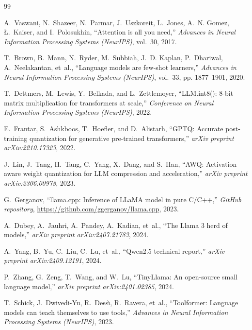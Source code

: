 \documentclass[12pt,a4paper,oneside]{report}
\begin{document}
\newpage
\begin{thebibliography}{99}

A.~Vaswani, N.~Shazeer, N.~Parmar, J.~Uszkoreit, L.~Jones, A.~N. Gomez, \L.~Kaiser, and I.~Polosukhin,
``Attention is all you need,''
\emph{Advances in Neural Information Processing Systems (NeurIPS)}, vol.~30, 2017.

T.~Brown, B.~Mann, N.~Ryder, M.~Subbiah, J.~D. Kaplan, P.~Dhariwal, A.~Neelakantan, et~al.,
``Language models are few-shot learners,''
\emph{Advances in Neural Information Processing Systems (NeurIPS)}, vol.~33, pp. 1877--1901, 2020.

T.~Dettmers, M.~Lewis, Y.~Belkada, and L.~Zettlemoyer,
``LLM.int8(): 8-bit matrix multiplication for transformers at scale,''
\emph{Conference on Neural Information Processing Systems (NeurIPS)}, 2022.

E.~Frantar, S.~Ashkboos, T.~Hoefler, and D.~Alistarh,
``GPTQ: Accurate post-training quantization for generative pre-trained transformers,''
\emph{arXiv preprint arXiv:2210.17323}, 2022.

J.~Lin, J.~Tang, H.~Tang, C.~Yang, X.~Dang, and S.~Han,
``AWQ: Activation-aware weight quantization for LLM compression and acceleration,''
\emph{arXiv preprint arXiv:2306.00978}, 2023.

G.~Gerganov,
``llama.cpp: Inference of LLaMA model in pure C/C++,''
\emph{GitHub repository}, \url{https://github.com/ggerganov/llama.cpp}, 2023.

A.~Dubey, A.~Jauhri, A.~Pandey, A.~Kadian, et~al.,
``The Llama 3 herd of models,''
\emph{arXiv preprint arXiv:2407.21783}, 2024.

A.~Yang, B.~Yu, C.~Liu, C.~Lu, et~al.,
``Qwen2.5 technical report,''
\emph{arXiv preprint arXiv:2409.12191}, 2024.

P.~Zhang, G.~Zeng, T.~Wang, and W.~Lu,
``TinyLlama: An open-source small language model,''
\emph{arXiv preprint arXiv:2401.02385}, 2024.

T.~Schick, J.~Dwivedi-Yu, R.~Dess{\`\i}, R.~Ravera, et~al.,
``Toolformer: Language models can teach themselves to use tools,''
\emph{Advances in Neural Information Processing Systems (NeurIPS)}, 2023.


\end{thebibliography}
\end{document}
